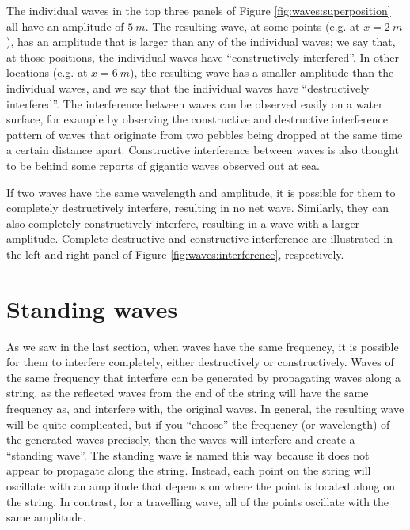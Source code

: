 The individual waves in the top three panels of Figure \ref{fig:waves:superposition} all have an amplitude of $\SI{5}{m}$. The resulting wave, at some points (e.g. at $x=\SI{2}{m}$), has an amplitude that is larger than any of the individual waves; we say that, at those positions, the individual waves have ``constructively interfered''. In other locations (e.g. at $x=\SI{6}{m}$), the resulting wave has a smaller amplitude than the individual waves, and we say that the individual waves have ``destructively interfered''. The interference between waves can be observed easily on a water surface, for example by observing the constructive and destructive interference pattern of waves that originate from two pebbles being dropped at the same time a certain distance apart. Constructive interference between waves is also thought to be behind some reports of gigantic waves observed out at sea.

If two waves have the same wavelength and amplitude, it is possible for them to completely destructively interfere, resulting in no net wave. Similarly, they can also completely constructively interfere, resulting in a wave with a larger amplitude. Complete destructive and constructive interference are illustrated in the left and right panel of Figure \ref{fig:waves:interference}, respectively.

\section{Standing waves}
As we saw in the last section, when waves have the same frequency, it is possible for them to interfere completely, either destructively or constructively. Waves of the same frequency that interfere can be generated by propagating waves along a string, as the reflected waves from the end of the string will have the same frequency as, and interfere with, the original waves. In general, the resulting wave will be quite complicated, but if you ``choose'' the frequency (or wavelength) of the generated waves precisely, then the waves will interfere and create a ``standing wave''. The standing wave is named this way because it does not appear to propagate along the string. Instead, each point on the string will oscillate with an amplitude that depends on where the point is located along on the string. In contrast, for a travelling wave, all of the points oscillate with the same amplitude.

